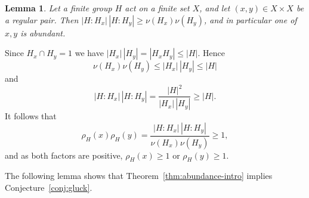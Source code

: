 \documentclass[10pt]{amsart}
\newtheorem{lemma}[theorem]{Lemma}
\theoremstyle{definition}
\renewcommand{\le}{\leqslant}
\renewcommand{\ge}{\geqslant}
\let\oldendproof\endproof
\renewenvironment{proof}[1][\proofname]{%
  \oldproof[\bfseries #1]%
}{\oldendproof}
\numberwithin{equation}{section}
\numberwithin{table}{section}
\begin{document}
\begin{lemma}\label{lem:regular-pair}
Let a finite group $H$ act on a finite set $X$, and let $(x,y)\in X\times X$
be a regular pair. Then $|H:H_x|\,|H:H_y|\ge\nu(H_x)\nu(H_y)$, and in particular
one of $x,y$ is abundant.
\end{lemma}

\begin{proof}
Since $H_x\cap H_y=1$ we have $|H_x|\,|H_y|=|H_xH_y|\le|H|$. Hence
$$\nu(H_x)\nu(H_y)\le|H_x|\,|H_y|\le|H|$$
and
$$|H:H_x|\,|H:H_y|=\frac{|H|^2}{|H_x|\,|H_y|}\ge|H|.$$
It follows that
$$\rho_H(x)\rho_H(y)=\frac{|H:H_x|\,|H:H_y|}{\nu(H_x)\nu(H_y)}\ge1,$$
and as both factors are positive, $\rho_H(x)\ge1$ or $\rho_H(y)\ge1$.
\end{proof}

The following lemma shows that Theorem~\ref{thm:abundance-intro} implies
Conjecture~\ref{conj:gluck}.
\end{document}
